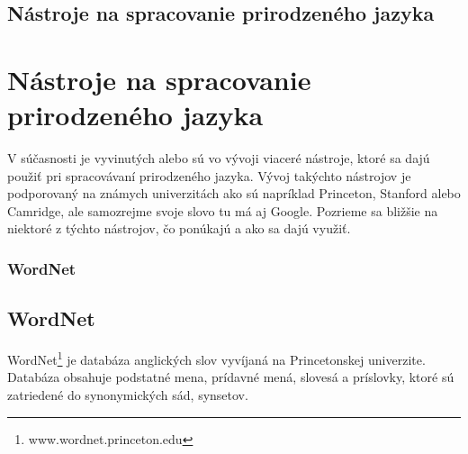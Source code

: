
%
%
{
	\subsection{Nástroje na spracovanie prirodzeného jazyka}
}
{
	\section{Nástroje na spracovanie prirodzeného jazyka}
}
\label{subsec:nlp_nastroje}
V súčasnosti je vyvinutých alebo sú vo vývoji viaceré nástroje, ktoré sa dajú použiť pri spracovávaní prirodzeného jazyka. Vývoj takýchto nástrojov je podporovaný na známych univerzitách ako sú napríklad Princeton, Stanford alebo Camridge, ale samozrejme svoje slovo tu má aj Google. Pozrieme sa bližšie na niektoré z týchto nástrojov, čo ponúkajú a ako sa dajú využiť.

%
%
{
	\subsubsection{WordNet}
}
{
	\subsection{WordNet}
}
\label{subsubsec:wordnet}
WordNet\footnote{www.wordnet.princeton.edu} je databáza anglických slov vyvíjaná na Princetonskej univerzite. Databáza obsahuje podstatné mena, prídavné mená, slovesá a príslovky, ktoré sú zatriedené do synonymických sád, synsetov.

